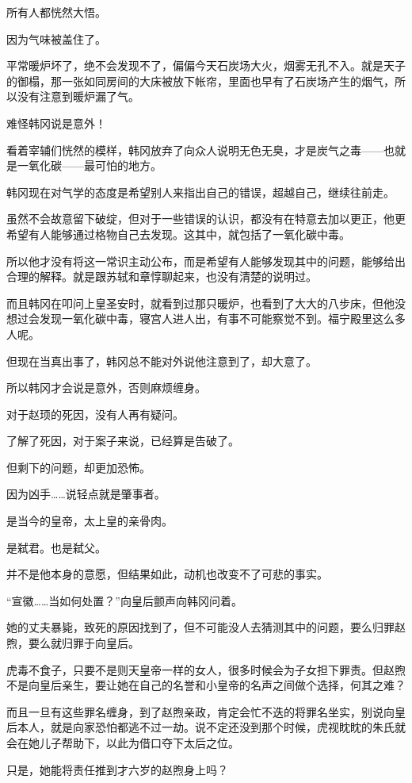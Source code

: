 所有人都恍然大悟。

因为气味被盖住了。

平常暖炉坏了，绝不会发现不了，偏偏今天石炭场大火，烟雾无孔不入。就是天子的御榻，那一张如同房间的大床被放下帐帘，里面也早有了石炭场产生的烟气，所以没有注意到暖炉漏了气。

难怪韩冈说是意外！

看着宰辅们恍然的模样，韩冈放弃了向众人说明无色无臭，才是炭气之毒——也就是一氧化碳——最可怕的地方。

韩冈现在对气学的态度是希望别人来指出自己的错误，超越自己，继续往前走。

虽然不会故意留下破绽，但对于一些错误的认识，都没有在特意去加以更正，他更希望有人能够通过格物自己去发现。这其中，就包括了一氧化碳中毒。

所以他才没有将这一常识主动公布，而是希望有人能够发现其中的问题，能够给出合理的解释。就是跟苏轼和章惇聊起来，也没有清楚的说明过。

而且韩冈在叩问上皇圣安时，就看到过那只暖炉，也看到了大大的八步床，但他没想过会发现一氧化碳中毒，寝宫人进人出，有事不可能察觉不到。福宁殿里这么多人呢。

但现在当真出事了，韩冈总不能对外说他注意到了，却大意了。

所以韩冈才会说是意外，否则麻烦缠身。

对于赵顼的死因，没有人再有疑问。

了解了死因，对于案子来说，已经算是告破了。

但剩下的问题，却更加恐怖。

因为凶手……说轻点就是肇事者。

是当今的皇帝，太上皇的亲骨肉。

是弑君。也是弑父。

并不是他本身的意愿，但结果如此，动机也改变不了可悲的事实。

“宣徽……当如何处置？”向皇后颤声向韩冈问着。

她的丈夫暴毙，致死的原因找到了，但不可能没人去猜测其中的问题，要么归罪赵煦，要么就归罪于向皇后。

虎毒不食子，只要不是则天皇帝一样的女人，很多时候会为子女担下罪责。但赵煦不是向皇后亲生，要让她在自己的名誉和小皇帝的名声之间做个选择，何其之难？

而且一旦有这些罪名缠身，到了赵煦亲政，肯定会忙不迭的将罪名坐实，别说向皇后本人，就是向家恐怕都逃不过一劫。说不定还没到那个时候，虎视眈眈的朱氏就会在她儿子帮助下，以此为借口夺下太后之位。

只是，她能将责任推到才六岁的赵煦身上吗？

